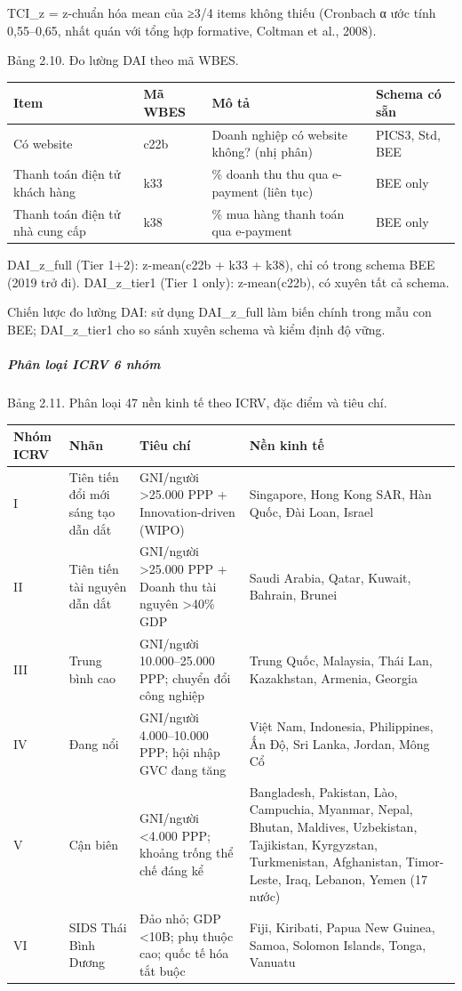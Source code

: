 \documentclass[12pt,a4paper]{article}
\begin{document}
TCI\_z = z-chuẩn hóa mean của ≥3/4 items không thiếu (Cronbach α ước
tính 0,55--0,65, nhất quán với tổng hợp formative, Coltman et al.,
2008).

Bảng 2.10. Đo lường DAI theo mã WBES.

\begin{longtable}[]{@{}llll@{}}
\toprule\noalign{}
Item & Mã WBES & Mô tả & Schema có sẵn \\
\midrule\noalign{}
\endhead
\bottomrule\noalign{}
\endlastfoot
Có website & c22b & Doanh nghiệp có website không? (nhị phân) & PICS3,
Std, BEE \\
Thanh toán điện tử khách hàng & k33 & \% doanh thu thu qua e-payment
(liên tục) & BEE only \\
Thanh toán điện tử nhà cung cấp & k38 & \% mua hàng thanh toán qua
e-payment & BEE only \\
\end{longtable}

DAI\_z\_full (Tier 1+2): z-mean(c22b + k33 + k38), chỉ có trong schema
BEE (2019 trở đi). DAI\_z\_tier1 (Tier 1 only): z-mean(c22b), có xuyên
tất cả schema.

Chiến lược đo lường DAI: sử dụng DAI\_z\_full làm biến chính trong mẫu
con BEE; DAI\_z\_tier1 cho so sánh xuyên schema và kiểm định độ vững.

\hypertarget{phuxe2n-loux1ea1i-icrv-6-nhuxf3m}{%
\subparagraph{Phân loại ICRV 6
nhóm}\label{phuxe2n-loux1ea1i-icrv-6-nhuxf3m}}

Bảng 2.11. Phân loại 47 nền kinh tế theo ICRV, đặc điểm và tiêu chí.

\begin{longtable}[]{@{}llll@{}}
\toprule\noalign{}
Nhóm ICRV & Nhãn & Tiêu chí & Nền kinh tế \\
\midrule\noalign{}
\endhead
\bottomrule\noalign{}
\endlastfoot
I & Tiên tiến đổi mới sáng tạo dẫn dắt & GNI/người \textgreater25.000
PPP + Innovation-driven (WIPO) & Singapore, Hong Kong SAR, Hàn Quốc, Đài
Loan, Israel \\
II & Tiên tiến tài nguyên dẫn dắt & GNI/người \textgreater25.000 PPP +
Doanh thu tài nguyên \textgreater40\% GDP & Saudi Arabia, Qatar, Kuwait,
Bahrain, Brunei \\
III & Trung bình cao & GNI/người 10.000--25.000 PPP; chuyển đổi công
nghiệp & Trung Quốc, Malaysia, Thái Lan, Kazakhstan, Armenia, Georgia \\
IV & Đang nổi & GNI/người 4.000--10.000 PPP; hội nhập GVC đang tăng &
Việt Nam, Indonesia, Philippines, Ấn Độ, Sri Lanka, Jordan, Mông Cổ \\
V & Cận biên & GNI/người \textless4.000 PPP; khoảng trống thể chế đáng
kể & Bangladesh, Pakistan, Lào, Campuchia, Myanmar, Nepal, Bhutan,
Maldives, Uzbekistan, Tajikistan, Kyrgyzstan, Turkmenistan, Afghanistan,
Timor-Leste, Iraq, Lebanon, Yemen (17 nước) \\
VI & SIDS Thái Bình Dương & Đảo nhỏ; GDP \textless10B; phụ thuộc cao;
quốc tế hóa tắt buộc & Fiji, Kiribati, Papua New Guinea, Samoa, Solomon
Islands, Tonga, Vanuatu \\
\end{longtable}
\end{document}
